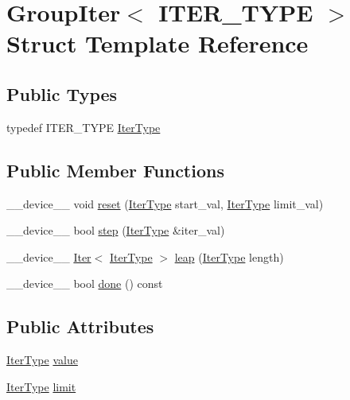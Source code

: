 \hypertarget{structGroupIter}{\section{Group\-Iter$<$ I\-T\-E\-R\-\_\-\-T\-Y\-P\-E $>$ Struct Template Reference}
\label{structGroupIter}
}
\subsection*{Public Types}
\begin{DoxyCompactItemize}
\item 
typedef I\-T\-E\-R\-\_\-\-T\-Y\-P\-E \hyperlink{structGroupIter_abe09fb339a76ba74ebdfea599aaaa63c}{Iter\-Type}
\end{DoxyCompactItemize}
\subsection*{Public Member Functions}
\begin{DoxyCompactItemize}
\item 
\-\_\-\-\_\-device\-\_\-\-\_\- void \hyperlink{structGroupIter_abe0945fe3231c009f78fd2dd789625c5}{reset} (\hyperlink{structGroupIter_abe09fb339a76ba74ebdfea599aaaa63c}{Iter\-Type} start\-\_\-val, \hyperlink{structGroupIter_abe09fb339a76ba74ebdfea599aaaa63c}{Iter\-Type} limit\-\_\-val)
\item 
\-\_\-\-\_\-device\-\_\-\-\_\- bool \hyperlink{structGroupIter_af1415e2e2966654b8748884ebf8159bd}{step} (\hyperlink{structGroupIter_abe09fb339a76ba74ebdfea599aaaa63c}{Iter\-Type} \&iter\-\_\-val)
\item 
\-\_\-\-\_\-device\-\_\-\-\_\- \hyperlink{structIter}{Iter}$<$ \hyperlink{structGroupIter_abe09fb339a76ba74ebdfea599aaaa63c}{Iter\-Type} $>$ \hyperlink{structGroupIter_adc5aaa8d8d244219dd389a1361236dbe}{leap} (\hyperlink{structGroupIter_abe09fb339a76ba74ebdfea599aaaa63c}{Iter\-Type} length)
\item 
\-\_\-\-\_\-device\-\_\-\-\_\- bool \hyperlink{structGroupIter_a54b82317ac2c6ccfc507e7b2a1a08b4b}{done} () const 
\end{DoxyCompactItemize}
\subsection*{Public Attributes}
\begin{DoxyCompactItemize}
\item 
\hyperlink{structGroupIter_abe09fb339a76ba74ebdfea599aaaa63c}{Iter\-Type} \hyperlink{structGroupIter_a96c1bc662378f184941306215209bf31}{value}
\item 
\hyperlink{structGroupIter_abe09fb339a76ba74ebdfea599aaaa63c}{Iter\-Type} \hyperlink{structGroupIter_ad94933e44272c4a58e083522aeeecf5f}{limit}
\end{DoxyCompactItemize}


